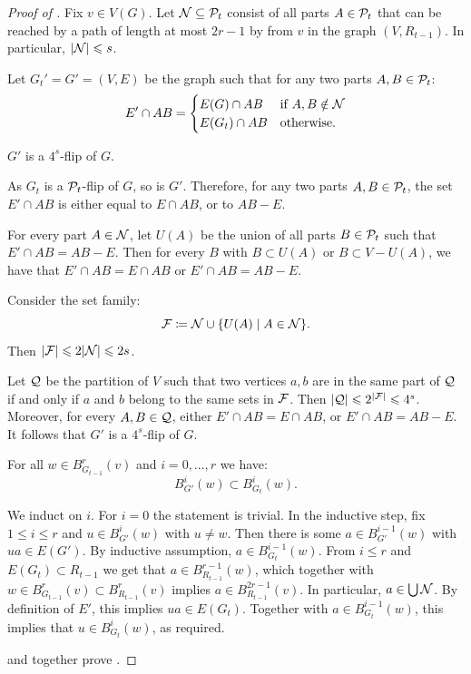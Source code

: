     \begin{proof}[Proof of ]
        Fix $v\in V(G)$. Let
 $\cal N\subset \cal P_t$ consist of all parts $A\in\cal P_t$ that can be reached by a path of length at most $2r-1$ by from $v$ in the graph $(V,R_{t-1})$.
In particular, $|\cal N|\le s$.

Let $G_t'=G'=(V,E)$ be the graph 
such that for any two parts $A,B\in\cal P_t$:
$$E'\cap AB=
\begin{cases}
    E(G)\cap AB&\text{if $A,B\notin\cal N$}\\
    E(G_t)\cap AB&\text{otherwise}.
\end{cases}$$

\begin{claim}\label{cl:k-flip}
    $G'$ is a $4^s$-flip of $G$.
\end{claim}
\begin{claimproof}
    As $G_t$ is a $\cal P_t$-flip of $G$, so is $G'$.
    Therefore, for any two parts $A,B\in\cal P_t$, 
    the set $E'\cap AB$ is either equal to $E\cap AB$,
    or to $AB-E$.

    For every part $A\in\cal N$, let $U(A)$ be the union of all parts 
    $B\in\cal P_t$ such that $E'\cap AB= AB-E$.
    Then for every $B$ with $B\subset U(A)$ or $B\subset V- U(A)$,
    we have that
    $E'\cap AB=E\cap AB$ or 
     $E'\cap AB=AB-E$.

    Consider the set family:
    $$\cal F\coloneqq \cal N \cup \setof{U(A)}{A\in \cal N}.$$ Then $|\cal F|\le 2|\cal N|\le 2s$.
    
    Let $\cal Q$ be the partition 
    of $V$ such that 
    two vertices $a,b$ are in the same part of $\cal Q$ if and only if $a$ and $b$ belong to the same sets in $\cal F$.
    Then $|\cal Q|\le 2^{|\cal F|}\le 4^{s}$.
    Moreover, for every $A,B\in \cal Q$,
    either $E'\cap AB=E\cap AB$,
    or $E'\cap AB=AB-E$.
    It follows that 
    $G'$ is a $4^s$-flip of $G$.
\end{claimproof}



\begin{claim}\label{cl:balls}
    For all $w\in B^r_{G_{t-1}}(v)$
 and $i=0,\ldots,r$ we have:
    $$B^i_{G'}(w)\subset B^i_{G_t}(w).$$
\end{claim}

\begin{claimproof}
    We induct on $i$. For $i=0$ the statement is trivial.
In the inductive step, fix $1\le i\le r$ and $u\in B^i_{G'}(w)$ with $u\neq w$.
Then there is some  $a\in B^{i-1}_{G'}(w)$ with $ua\in E(G')$.
By inductive assumption, $a\in B^{i-1}_{G_t}(w)$.
From  $i\le r$ and  $E(G_t)\subset R_{t-1}$
we get that $a\in B^{r-1}_{R_{t-1}}(w)$,
which together with $w\in B^{r}_{G_{t-1}}(v)\subset B^{r}_{R_{t-1}}(v)$ implies $a\in B^{2r-1}_{R_{t-1}}(v)$. In particular, $a\in \bigcup \cal N$.
By definition of $E'$, this implies $ua\in E(G_t)$. Together with 
$a\in B^{i-1}_{G_t}(w)$, this implies that $u\in B^{i}_{G_t}(w)$, as required.
\end{claimproof}
 and  together prove .
\end{proof}




